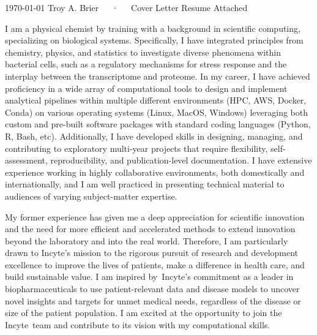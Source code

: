 \documentclass[11pt, a4paper]{awesome-cv}
\newcommand{\companyname}{Incyte}
\begin{document}
	
	\makecvheader[R]
	
	
	\makecvfooter
	{\today}
	{Troy A. Brier~~~·~~~Cover Letter}
	{Resume Attached}
	
	\makelettertitle
	\begin{cvletter}
		I am a physical chemist by training with a background in scientific computing, specializing on biological systems.
		Specifically, I have integrated principles from chemistry, physics, and statistics to investigate diverse phenomena within bacterial cells, such as a regulatory mechanisms for stress response and the interplay between the transcriptome and proteome.	
		In my career, I have achieved proficiency in a wide array of computational tools to design and implement analytical pipelines within multiple different environments (HPC, AWS, Docker, Conda) on various operating systems (Linux, MacOS, Windows) leveraging both custom and pre-built software packages with standard coding languages (Python, R, Bash, etc).
		Additionally, I have developed skills in designing, managing, and contributing to exploratory multi-year projects that require flexibility, self-assessment, reproducibility, and publication-level documentation.
		I have extensive experience working in highly collaborative environments, both domestically and internationally, and I am well practiced in presenting technical material to audiences of varying subject-matter expertise.
		
				
		\lettersection{Why \companyname?}
		My former experience has given me a deep appreciation for scientific innovation and the need for more efficient and accelerated methods to extend innovation beyond the laboratory and into the real world. 	
		Therefore, I am particularly drawn to \companyname's mission to the rigorous pursuit of research and development excellence to improve the lives of patients, make a difference in health care, and build sustainable value.
		I am inspired by~\companyname's commitment as a leader in biopharmaceuticals to use patient-relevant data and disease models to uncover novel insights and targets for unmet medical needs, regardless of the disease or size of the patient population.
		I am excited at the opportunity to join the \companyname~team and contribute to its vision with my computational skills.
				

\end{cvletter}
\end{document}
